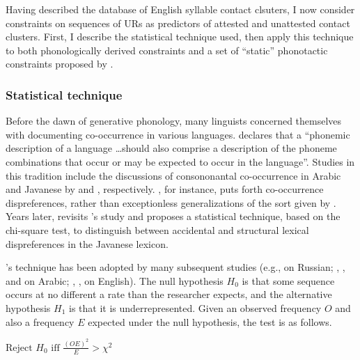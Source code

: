 
Having described the database of English syllable contact clsuters, I now consider constraints on sequences of URs as predictors of attested and unattested contact clusters. First, I describe the statistical technique used, then apply this technique to both phonologically derived constraints and a set of ``static'' phonotactic constraints proposed by \citet{Pierrehumbert1994}. 

\subsubsection{Statistical technique}
\label{stattech}

Before the dawn of generative phonology, many linguists concerned themselves with documenting co-occurrence in various languages. \citet[][28]{Vogt1954} declares that a ``phonemic description of a language \ldots should also comprise a description of the phoneme combinations that occur or may be expected to occur in the language''. Studies in this tradition include the discussions of consononantal co-occurrence in Arabic and Javanese by \citet{Greenberg1950} and \citet{Uhlenbeck1950}, respectively. \citeauthor{Uhlenbeck1950}, for instance, puts forth co-occurrence dispreferences, rather than exceptionless generalizations of the sort given by \citet{Greenberg1950}. Years later, \citet{Mester1988} revisits \citeauthor{Uhlenbeck1950}'s study and proposes a statistical technique, based on the chi-square test, to distinguish between accidental and structural lexical dispreferences in the Javanese lexicon. 

\citeauthor{Mester1988}'s technique has been adopted by many subsequent studies (e.g., \citealt{Padgett1992,Padgett1995} on Russian; \citealt{Pierrehumbert1993}, \citealt{Frisch1996}, and \citealt{Frisch2004} on Arabic; \citealt{Berkley1994b,Berkley1994a,Berkley2000}, \citealt{Dmitrieva2008a}, \citealt{Dmitrieva2008b} on English). The null hypothesis $H_0$ is that some sequence occurs at no different a rate than the researcher expects, and the alternative hypothesis $H_1$ is that it is underrepresented. Given an observed frequency $O$ and also a frequency $E$ expected under the null hypothesis, the test is as follows.

\ex $\displaystyle \textrm{Reject } H_0 \textrm{ iff } \frac{(O E) ^ 2}{E} >
χ^2$ \xe

  
